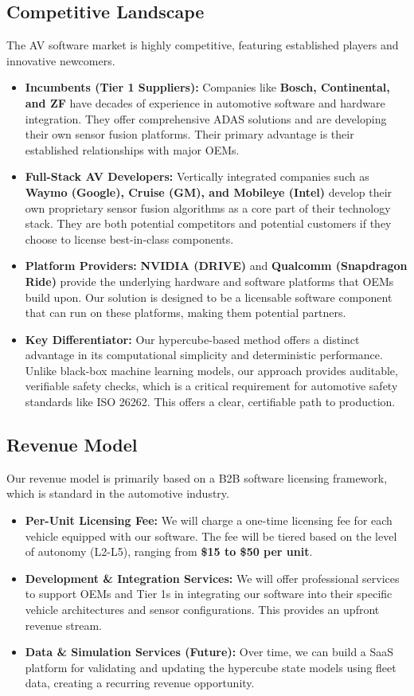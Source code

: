 \documentclass{article}
\begin{document}
\subsection{Competitive Landscape}
The AV software market is highly competitive, featuring established players and innovative newcomers.
\begin{itemize}
    \item \textbf{Incumbents (Tier 1 Suppliers):} Companies like \textbf{Bosch, Continental, and ZF} have decades of experience in automotive software and hardware integration. They offer comprehensive ADAS solutions and are developing their own sensor fusion platforms. Their primary advantage is their established relationships with major OEMs.
    \item \textbf{Full-Stack AV Developers:} Vertically integrated companies such as \textbf{Waymo (Google), Cruise (GM), and Mobileye (Intel)} develop their own proprietary sensor fusion algorithms as a core part of their technology stack. They are both potential competitors and potential customers if they choose to license best-in-class components.
    \item \textbf{Platform Providers:} \textbf{NVIDIA (DRIVE)} and \textbf{Qualcomm (Snapdragon Ride)} provide the underlying hardware and software platforms that OEMs build upon. Our solution is designed to be a licensable software component that can run on these platforms, making them potential partners.
    \item \textbf{Key Differentiator:} Our hypercube-based method offers a distinct advantage in its computational simplicity and deterministic performance. Unlike black-box machine learning models, our approach provides auditable, verifiable safety checks, which is a critical requirement for automotive safety standards like ISO 26262. This offers a clear, certifiable path to production.
\end{itemize}

\subsection{Revenue Model}
Our revenue model is primarily based on a B2B software licensing framework, which is standard in the automotive industry.
\begin{itemize}
    \item \textbf{Per-Unit Licensing Fee:} We will charge a one-time licensing fee for each vehicle equipped with our software. The fee will be tiered based on the level of autonomy (L2-L5), ranging from \textbf{\$15 to \$50 per unit}.
    \item \textbf{Development & Integration Services:} We will offer professional services to support OEMs and Tier 1s in integrating our software into their specific vehicle architectures and sensor configurations. This provides an upfront revenue stream.
    \item \textbf{Data & Simulation Services (Future):} Over time, we can build a SaaS platform for validating and updating the hypercube state models using fleet data, creating a recurring revenue opportunity.
\end{itemize}
\end{document}
